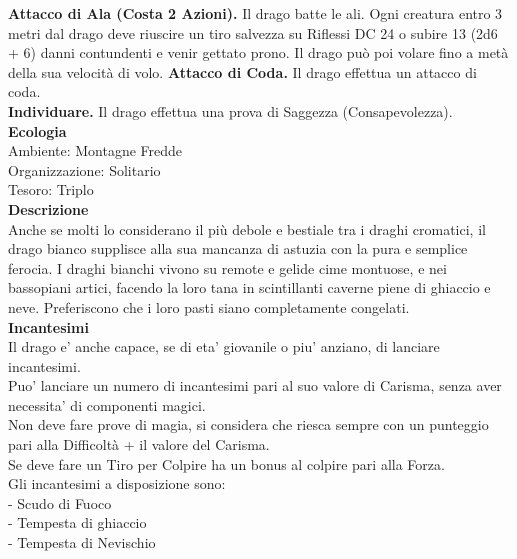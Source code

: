 \begin{multicols}{2}
\textbf{Attacco di Ala (Costa 2 Azioni).} Il drago batte le ali. Ogni creatura entro 3 metri dal drago deve riuscire un tiro salvezza su Riflessi DC  24 o subire 13 (2d6 + 6) danni contundenti e venir gettato prono. Il drago può poi volare fino a metà della sua velocità di volo. \textbf{Attacco di Coda.} Il drago effettua un attacco di coda. \\
\textbf{Individuare.} Il drago effettua una prova di Saggezza (Consapevolezza).
\textbf{Ecologia}\\
Ambiente: Montagne Fredde\\
Organizzazione: Solitario\\
Tesoro: Triplo\\
\textbf{Descrizione}\\
Anche se molti lo considerano il più debole e bestiale tra i draghi cromatici, il drago bianco supplisce alla sua mancanza di astuzia con la pura e semplice ferocia. I draghi bianchi vivono su remote e gelide cime montuose, e nei bassopiani artici, facendo la loro tana in scintillanti caverne piene di ghiaccio e neve. Preferiscono che i loro pasti siano completamente congelati.\\
\textbf{Incantesimi}\\
Il drago e' anche capace, se di eta' giovanile o piu' anziano, di lanciare incantesimi.\\
Puo' lanciare un numero di incantesimi pari al suo valore di Carisma, senza aver necessita' di componenti magici.\\
Non deve fare prove di magia, si considera che riesca sempre con un punteggio pari alla Difficoltà + il valore del Carisma.\\
Se deve fare un Tiro per Colpire ha un bonus al colpire pari alla Forza.\\
Gli incantesimi a disposizione sono:\\
- Scudo di Fuoco\\
- Tempesta di ghiaccio\\
- Tempesta di Nevischio\\


\end{multicols}
